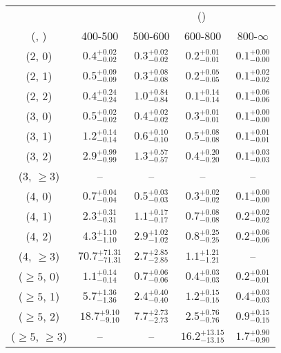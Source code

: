 \begin{table}[h!]
\tiny
\centering
{}
\begin{tabular}
{ccccc}
	\hline\hline
&	& \multicolumn{4}{c}{\scalht (\gev)} \\ 
	 (\njet,  \nb) & 400-500 & 500-600 & 600-800 & 800-$\infty$ \\ [0.8ex] 
\hline
	(2, 0) & $0.4^{+ 0.02 }_{- 0.02 }$ & $0.3^{+ 0.02 }_{- 0.02 }$ & $0.2^{+ 0.01 }_{- 0.01 }$ & $0.1^{+ 0.00 }_{- 0.00 }$ \\[0.5ex] 
	(2, 1) & $0.5^{+ 0.09 }_{- 0.09 }$ & $0.3^{+ 0.08 }_{- 0.08 }$ & $0.2^{+ 0.05 }_{- 0.05 }$ & $0.1^{+ 0.02 }_{- 0.02 }$ \\[0.5ex] 
	(2, 2) & $0.4^{+ 0.24 }_{- 0.24 }$ & $1.0^{+ 0.84 }_{- 0.84 }$ & $0.1^{+ 0.14 }_{- 0.14 }$ & $0.1^{+ 0.06 }_{- 0.06 }$ \\[0.5ex] 
	(3, 0) & $0.5^{+ 0.02 }_{- 0.02 }$ & $0.4^{+ 0.02 }_{- 0.02 }$ & $0.3^{+ 0.01 }_{- 0.01 }$ & $0.1^{+ 0.00 }_{- 0.00 }$ \\[0.5ex] 
	(3, 1) & $1.2^{+ 0.14 }_{- 0.14 }$ & $0.6^{+ 0.10 }_{- 0.10 }$ & $0.5^{+ 0.08 }_{- 0.08 }$ & $0.1^{+ 0.01 }_{- 0.01 }$ \\[0.5ex] 
	(3, 2) & $2.9^{+ 0.99 }_{- 0.99 }$ & $1.3^{+ 0.57 }_{- 0.57 }$ & $0.4^{+ 0.20 }_{- 0.20 }$ & $0.1^{+ 0.03 }_{- 0.03 }$ \\[0.5ex] 
	(3, $\ge3$) & -- & -- & -- & -- \\[0.5ex] 
	(4, 0) & $0.7^{+ 0.04 }_{- 0.04 }$ & $0.5^{+ 0.03 }_{- 0.03 }$ & $0.3^{+ 0.02 }_{- 0.02 }$ & $0.1^{+ 0.00 }_{- 0.00 }$ \\[0.5ex] 
	(4, 1) & $2.3^{+ 0.31 }_{- 0.31 }$ & $1.1^{+ 0.17 }_{- 0.17 }$ & $0.7^{+ 0.08 }_{- 0.08 }$ & $0.2^{+ 0.02 }_{- 0.02 }$ \\[0.5ex] 
	(4, 2) & $4.3^{+ 1.10 }_{- 1.10 }$ & $2.9^{+ 1.02 }_{- 1.02 }$ & $0.8^{+ 0.25 }_{- 0.25 }$ & $0.2^{+ 0.06 }_{- 0.06 }$ \\[0.5ex] 
	(4, $\ge3$) & $70.7^{+ 71.31 }_{- 71.31 }$ & $2.7^{+ 2.85 }_{- 2.85 }$ & $1.1^{+ 1.21 }_{- 1.21 }$ & -- \\[0.5ex] 
	($\ge5$, 0) & $1.1^{+ 0.14 }_{- 0.14 }$ & $0.7^{+ 0.06 }_{- 0.06 }$ & $0.4^{+ 0.03 }_{- 0.03 }$ & $0.2^{+ 0.01 }_{- 0.01 }$ \\[0.5ex] 
	($\ge5$, 1) & $5.7^{+ 1.36 }_{- 1.36 }$ & $2.4^{+ 0.40 }_{- 0.40 }$ & $1.2^{+ 0.15 }_{- 0.15 }$ & $0.4^{+ 0.03 }_{- 0.03 }$ \\[0.5ex] 
	($\ge5$, 2) & $18.7^{+ 9.10 }_{- 9.10 }$ & $7.7^{+ 2.73 }_{- 2.73 }$ & $2.5^{+ 0.76 }_{- 0.76 }$ & $0.9^{+ 0.15 }_{- 0.15 }$ \\[0.5ex] 
	($\ge5$, $\ge3$) & -- & -- & $16.2^{+ 13.15 }_{- 13.15 }$ & $1.7^{+ 0.90 }_{- 0.90 }$ \\[0.5ex] 
	\hline
	\hline
\end{tabular}
\end{table}
